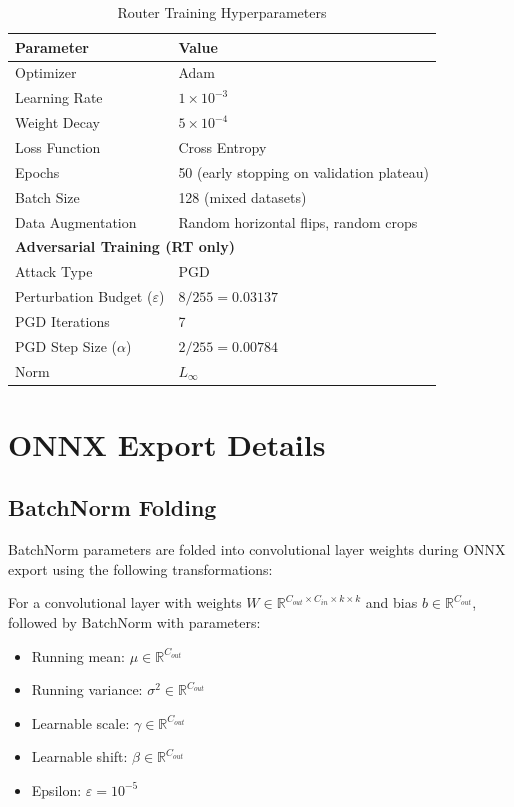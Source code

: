 \documentclass[11pt,a4paper]{article}
\begin{document}
\begin{table}[H]
\centering
\begin{tabular}{ll}
\toprule
\textbf{Parameter} & \textbf{Value} \\
\midrule
Optimizer & Adam \\
Learning Rate & $1 \times 10^{-3}$ \\
Weight Decay & $5 \times 10^{-4}$ \\
Loss Function & Cross Entropy \\
Epochs & 50 (early stopping on validation plateau) \\
Batch Size & 128 (mixed datasets) \\
Data Augmentation & Random horizontal flips, random crops \\
\midrule
\multicolumn{2}{l}{\textbf{Adversarial Training (RT only)}} \\
\midrule
Attack Type & PGD \\
Perturbation Budget ($\varepsilon$) & $8/255 = 0.03137$ \\
PGD Iterations & 7 \\
PGD Step Size ($\alpha$) & $2/255 = 0.00784$ \\
Norm & $L_\infty$ \\
\bottomrule
\end{tabular}
\caption{Router Training Hyperparameters}
\end{table}

\section{ONNX Export Details}

\subsection{BatchNorm Folding}

BatchNorm parameters are folded into convolutional layer weights during ONNX export using the following transformations:

For a convolutional layer with weights $W \in \mathbb{R}^{C_{out} \times C_{in} \times k \times k}$ and bias $b \in \mathbb{R}^{C_{out}}$, followed by BatchNorm with parameters:
\begin{itemize}
    \item Running mean: $\mu \in \mathbb{R}^{C_{out}}$
    \item Running variance: $\sigma^2 \in \mathbb{R}^{C_{out}}$
    \item Learnable scale: $\gamma \in \mathbb{R}^{C_{out}}$
    \item Learnable shift: $\beta \in \mathbb{R}^{C_{out}}$
    \item Epsilon: $\varepsilon = 10^{-5}$
\end{itemize}
\end{document}
